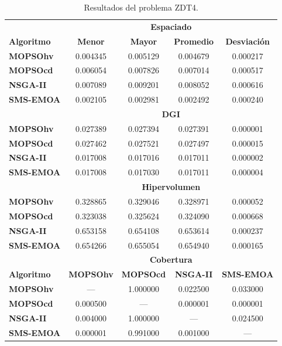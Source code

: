  \begin{table}
 \begin{center}
  \begin{tabular}{|l|cc|cc|} \hline
    & \multicolumn{4}{|c|}{\textbf{Espaciado}} \\ 
	\textbf{Algoritmo} & \textbf{Menor} & \textbf{Mayor} & \textbf{Promedio} & \textbf{Desviaci\'on} \\  \hline\hline
	\textbf{MOPSOhv} &0.004345 & 0.005129 & 0.004679 & 0.000217 \\ 
	\textbf{MOPSOcd} &0.006054 & 0.007826 & 0.007014 & 0.000517  \\ 
	\textbf{NSGA-II} &0.007089 & 0.009201 & 0.008052 & 0.000616  \\  
	\textbf{SMS-EMOA}&0.002105 & 0.002981 & 0.002492 & 0.000240\\  
	\hline\hline
    & \multicolumn{4}{|c|}{\textbf{DGI}} \\ 	\hline \hline
	\textbf{MOPSOhv} &0.027389 & 0.027394 & 0.027391 & 0.000001   \\ 
	\textbf{MOPSOcd} &0.027462 & 0.027521 & 0.027497 & 0.000015  \\ 
	\textbf{NSGA-II} &0.017008 & 0.017016 & 0.017011 & 0.000002   \\  
	\textbf{SMS-EMOA}&0.017008 & 0.017030 & 0.017011 & 0.000004  \\  
	\hline\hline
    & \multicolumn{4}{|c|}{\textbf{Hipervolumen}} \\ 	\hline \hline
	\textbf{MOPSOhv} &0.328865 & 0.329046 & 0.328971 & 0.000052  \\ 
	\textbf{MOPSOcd} &0.323038 & 0.325624 & 0.324090 & 0.000668  \\ 
	\textbf{NSGA-II} &0.653158 & 0.654108 & 0.653614 & 0.000237  \\  
	\textbf{SMS-EMOA}&0.654266 & 0.655054 & 0.654940 & 0.000165  \\  
	\hline
    & \multicolumn{4}{|c|}{\textbf{Cobertura}} \\ \hline\hline 
	\textbf{Algoritmo} & \textbf{MOPSOhv} & \textbf{MOPSOcd} & \textbf{NSGA-II} & \textbf{SMS-EMOA} \\  \hline \hline
	\textbf{MOPSOhv} & ---      & 1.000000 & 0.022500 & 0.033000 \\ 
	\textbf{MOPSOcd} & 0.000500 & ---      & 0.000001 & 0.000001   \\ 
	\textbf{NSGA-II} & 0.004000 & 1.000000 & ---      & 0.024500 \\  
	\textbf{SMS-EMOA}& 0.000001 & 0.991000 & 0.001000 & --- \\  
	\hline\hline
	\end{tabular}
\caption{Resultados del problema ZDT4.}
  \label{tab:zdt4}
\end{center}
\end{table}
